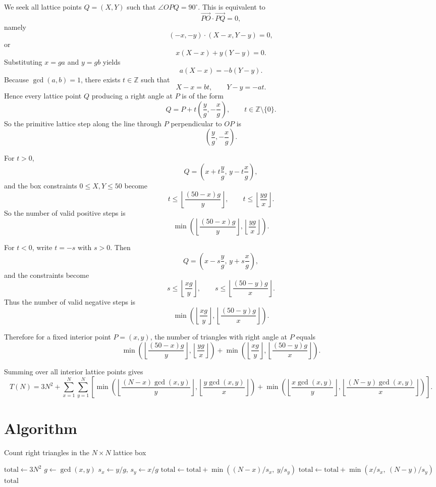 \documentclass[12pt]{article}
\begin{document}
We seek all lattice points $Q=(X,Y)$ such that $\angle OPQ=90^\circ$. This is equivalent to
\[
\overrightarrow{PO}\cdot \overrightarrow{PQ}=0,
\]
namely
\[
(-x,-y)\cdot (X-x,Y-y)=0,
\]
or
\[
x(X-x)+y(Y-y)=0.
\]
Substituting $x=ga$ and $y=gb$ yields
\[
a(X-x)=-b(Y-y).
\]
Because $\gcd(a,b)=1$, there exists $t\in\mathbb Z$ such that
\[
X-x=bt,\qquad Y-y=-at.
\]
Hence every lattice point $Q$ producing a right angle at $P$ is of the form
\[
Q=P+t\left(\frac{y}{g},-\frac{x}{g}\right),\qquad t\in\mathbb Z\setminus\{0\}.
\]
So the primitive lattice step along the line through $P$ perpendicular to $OP$ is
\[
\left(\frac{y}{g},-\frac{x}{g}\right).
\]

For $t>0$,
\[
Q=\left(x+t\frac{y}{g},\,y-t\frac{x}{g}\right),
\]
and the box constraints $0\le X,Y\le 50$ become
\[
t\le \left\lfloor \frac{(50-x)g}{y}\right\rfloor,
\qquad
t\le \left\lfloor \frac{yg}{x}\right\rfloor.
\]
So the number of valid positive steps is
\[
\min\!\left(
\left\lfloor \frac{(50-x)g}{y}\right\rfloor,
\left\lfloor \frac{yg}{x}\right\rfloor
\right).
\]

For $t<0$, write $t=-s$ with $s>0$. Then
\[
Q=\left(x-s\frac{y}{g},\,y+s\frac{x}{g}\right),
\]
and the constraints become
\[
s\le \left\lfloor \frac{xg}{y}\right\rfloor,
\qquad
s\le \left\lfloor \frac{(50-y)g}{x}\right\rfloor.
\]
Thus the number of valid negative steps is
\[
\min\!\left(
\left\lfloor \frac{xg}{y}\right\rfloor,
\left\lfloor \frac{(50-y)g}{x}\right\rfloor
\right).
\]

Therefore for a fixed interior point $P=(x,y)$, the number of triangles with right angle at $P$ equals
\[
\min\!\left(
\left\lfloor \frac{(50-x)g}{y}\right\rfloor,
\left\lfloor \frac{yg}{x}\right\rfloor
\right)
+
\min\!\left(
\left\lfloor \frac{xg}{y}\right\rfloor,
\left\lfloor \frac{(50-y)g}{x}\right\rfloor
\right).
\]

Summing over all interior lattice points gives
\[
T(N)=3N^2+\sum_{x=1}^{N}\sum_{y=1}^{N}
\left[
\min\!\left(
\left\lfloor \frac{(N-x)\gcd(x,y)}{y}\right\rfloor,
\left\lfloor \frac{y\gcd(x,y)}{x}\right\rfloor
\right)
+
\min\!\left(
\left\lfloor \frac{x\gcd(x,y)}{y}\right\rfloor,
\left\lfloor \frac{(N-y)\gcd(x,y)}{x}\right\rfloor
\right)
\right].
\]

\section{Algorithm}

\begin{algorithm}[H]
\caption{Count right triangles in the $N\times N$ lattice box}
\begin{algorithmic}[1]
\STATE $\mathrm{total}\gets 3N^2$
        \STATE $g\gets \gcd(x,y)$
        \STATE $s_x\gets y/g$, $s_y\gets x/g$
        \STATE $\mathrm{total}\gets \mathrm{total} + \min((N-x)/s_x,\ y/s_y)$
        \STATE $\mathrm{total}\gets \mathrm{total} + \min(x/s_x,\ (N-y)/s_y)$
    \ENDFOR
\ENDFOR
\RETURN $\mathrm{total}$
\end{algorithmic}
\end{algorithm}
\end{document}
